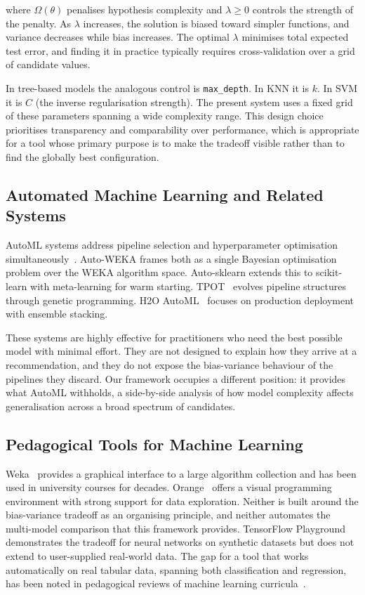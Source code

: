 \documentclass[conference]{IEEEtran}
\begin{document}
where $\Omega(\theta)$ penalises hypothesis complexity and $\lambda \geq 0$ controls the strength of the penalty. As $\lambda$ increases, the solution is biased toward simpler functions, and variance decreases while bias increases. The optimal $\lambda$ minimises total expected test error, and finding it in practice typically requires cross-validation over a grid of candidate values.

In tree-based models the analogous control is \texttt{max\_depth}. In KNN it is $k$. In SVM it is $C$ (the inverse regularisation strength). The present system uses a fixed grid of these parameters spanning a wide complexity range. This design choice prioritises transparency and comparability over performance, which is appropriate for a tool whose primary purpose is to make the tradeoff visible rather than to find the globally best configuration.

\subsection{Automated Machine Learning and Related Systems}

AutoML systems address pipeline selection and hyperparameter optimisation simultaneously~\cite{b4, b5}. Auto-WEKA frames both as a single Bayesian optimisation problem over the WEKA algorithm space. Auto-sklearn extends this to scikit-learn with meta-learning for warm starting. TPOT~\cite{b28} evolves pipeline structures through genetic programming. H2O AutoML~\cite{b29} focuses on production deployment with ensemble stacking.

These systems are highly effective for practitioners who need the best possible model with minimal effort. They are not designed to explain how they arrive at a recommendation, and they do not expose the bias-variance behaviour of the pipelines they discard. Our framework occupies a different position: it provides what AutoML withholds, a side-by-side analysis of how model complexity affects generalisation across a broad spectrum of candidates.

\subsection{Pedagogical Tools for Machine Learning}

Weka~\cite{b30} provides a graphical interface to a large algorithm collection and has been used in university courses for decades. Orange~\cite{b31} offers a visual programming environment with strong support for data exploration. Neither is built around the bias-variance tradeoff as an organising principle, and neither automates the multi-model comparison that this framework provides. TensorFlow Playground demonstrates the tradeoff for neural networks on synthetic datasets but does not extend to user-supplied real-world data. The gap for a tool that works automatically on real tabular data, spanning both classification and regression, has been noted in pedagogical reviews of machine learning curricula~\cite{b32}.
\end{document}
